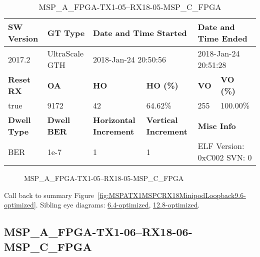 \begin{table}[h]
\centering
\caption{MSP\_A\_FPGA-TX1-05--RX18-05-MSP\_C\_FPGA}
\label{tab:MSPAFPGATX105RX1805MSPCFPGA9.6-optimized}
\begin{tabular}{@{}|l|l|l|l|l|l|@{}}
\toprule
\textbf{SW Version}                & \textbf{GT Type}   & \multicolumn{2}{l|}{\textbf{Date and Time Started}}            & \multicolumn{2}{l|}{\textbf{Date and Time Ended}}        \\ \midrule
2017.2                       & UltraScale GTH          & \multicolumn{2}{l|}{2018-Jan-24 20:50:56}                   & \multicolumn{2}{l|}{2018-Jan-24 20:51:28}               \\ \midrule
\textbf{Reset RX}                  & \textbf{OA} & \textbf{HO}   & \textbf{HO (\%)} & \textbf{VO} & \textbf{VO (\%)} \\ \midrule
true & 9172        & 42          & 64.62\%        & 255        & 100.00\%       \\ \midrule
\textbf{Dwell Type}                & \textbf{Dwell BER} & \textbf{Horizontal Increment} & \textbf{Vertical Increment}    & \multicolumn{2}{l|}{\textbf{Misc Info}}                  \\ \midrule
BER                            & 1e-7        & 1        & 1           & \multicolumn{2}{l|}{ELF Version: 0xC002 SVN: 0}                         \\ \bottomrule
\end{tabular}
\end{table}

\begin{figure}[h]
\caption{MSP\_A\_FPGA-TX1-05--RX18-05-MSP\_C\_FPGA} \label{fig:MSPAFPGATX105RX1805MSPCFPGA9.6-optimized}
\end{figure}

Call back to summary Figure~\ref{fig:MSPATX1MSPCRX18MinipodLoopback9.6-optimized}.
Sibling eye diagrams: \hyperref[sec:MSPAFPGATX105RX1805MSPCFPGA6.4-optimized]{6.4-optimized}, \hyperref[sec:MSPAFPGATX105RX1805MSPCFPGA12.8-optimized]{12.8-optimized}.

\clearpage
\newpage


\subsection{MSP\_A\_FPGA-TX1-06--RX18-06-MSP\_C\_FPGA}\label{sec:MSPAFPGATX106RX1806MSPCFPGA9.6-optimized}

